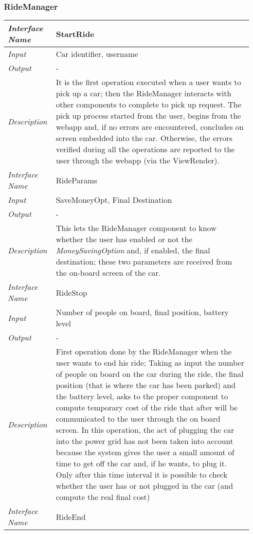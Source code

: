 \documentclass[11pt,a4paper]{report}
\begin{document}
\subsubsection{RideManager}
\begin{tabularx}{\textwidth}{|>{\em}l|X|}
	\hline
	Interface Name& StartRide\\
	\hline
	Input & Car identifier, username\\
	\hline
	Output & -\\
	\hline
	Description &It is the first operation executed when a user wants to pick up a car; then the RideManager interacts with other components to complete to pick up request. The pick up process started from the user, begins from the webapp and, if no errors are encountered, concludes on screen embedded into the car. Otherwise, the errors verified during all the operations are reported to the user through the webapp (via the ViewRender).\\
	\hline
	\hline
	Interface Name& RideParams\\
	\hline
	Input &SaveMoneyOpt, Final Destination\\
	\hline
	Output & -\\
	\hline
	Description &This lets the RideManager component to know whether the user has enabled or not the \textit{MoneySavingOption} and, if enabled, the final destination; these two parameters are received from the on-board screen of the car.\\
	\hline
	\hline
	Interface Name& RideStop\\
	\hline
	Input &Number of people on board, final position, battery level\\
	\hline
	Output & -\\
	\hline
	Description &First operation done by the RideManager when the user wants to end his ride; Taking as input the number of people on board on the car during the ride, the final position (that is where the car has been parked) and the battery level, asks to the proper component to compute temporary cost of the ride that after will be communicated to the user through the on board screen. In this operation, the act of plugging the car into the power grid has not been taken into account because the system gives the user a small amount of time to get off the car and, if he wants, to plug it. Only after this time interval it is possible to check whether the user has or not plugged in the car (and compute the real final cost)\\
	\hline
	\hline
	Interface Name& RideEnd\\

\end{tabularx}
\end{document}
